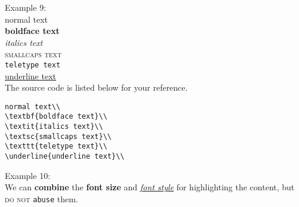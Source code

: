 \documentclass[12pt,a4paper]{article} %
\begin{document}
\noindent Example 9:\\
normal text\\
\textbf{boldface text}\\
\textit{italics text}\\
\textsc{smallcaps text}\\
\texttt{teletype text}\\
\underline{underline text}\\

\noindent The source code is listed below for your reference.
\begin{verbatim}
normal text\\
\textbf{boldface text}\\
\textit{italics text}\\
\textsc{smallcaps text}\\
\texttt{teletype text}\\
\underline{underline text}\\
\end{verbatim}

\noindent Example 10:\\
We can \textbf{\small combine} the \textbf{\large font size} and \underline{\textit{font style}} for highlighting the content, but \textsc{do not} \texttt{\huge abuse} them.
\end{document}
